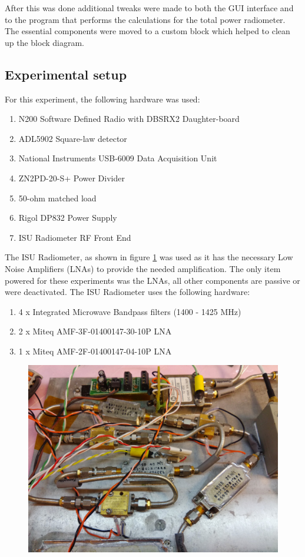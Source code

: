 After this was done additional tweaks were made to both the GUI interface and to the program that performs the calculations for the total power radiometer.  The essential components were moved to a custom block which helped to clean up the block diagram.  


\subsection{Experimental setup} \label{exp1_setup}
For this experiment, the following hardware was used:

\begin{enumerate}
\item N200 Software Defined Radio with DBSRX2 Daughter-board
\item ADL5902 Square-law detector
\item National Instruments USB-6009 Data Acquisition Unit
\item ZN2PD-20-S+ Power Divider
\item 50-ohm matched load
\item Rigol DP832 Power Supply
\item ISU Radiometer RF Front End
\end{enumerate}

The ISU Radiometer, as shown in figure \ref{ISURF} was used as it has the necessary Low Noise Amplifiers (LNAs) to provide the needed amplification.  The only item powered for these experiments was the LNAs, all other components are passive or were deactivated.  The ISU Radiometer uses the following hardware:

\begin{enumerate}
\item 4 x Integrated Microwave Bandpass filters (1400 - 1425 MHz)
\item 2 x Miteq AMF-3F-01400147-30-10P LNA
\item 1 x Miteq AMF-2F-01400147-04-10P LNA
\end{enumerate}

{\begin{figure}[h!tb] \centering
\includegraphics[width=\textwidth]{Images/ISU_RF.jpg}
\label{ISURF}
\end{figure}
}

